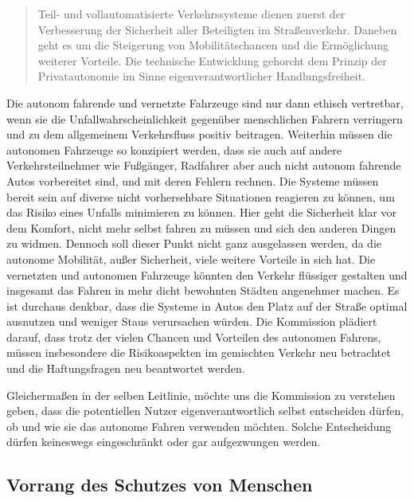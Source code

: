 \documentclass[twoside,a4paper,12pt]{article}
\begin{document}
\begin{quote}
\glqq
Teil- und vollautomatisierte Verkehrssysteme dienen zuerst der Verbesserung der Sicherheit aller Beteiligten im Straßenverkehr. 
Daneben geht es um die Steigerung von Mobilitätschancen und die Ermöglichung weiterer Vorteile. Die technische Entwicklung 
gehorcht dem Prinzip der Privatautonomie im Sinne eigenverantwortlicher Handlungsfreiheit.\grqq\mbox{~\cite[S. 10]{ek}}
\end{quote}
Die autonom fahrende und vernetzte Fahrzeuge sind nur dann ethisch vertretbar,
 wenn sie die Unfallwahrscheinlichkeit gegenüber menschlichen Fahrern verringern und zu dem allgemeinem Verkehrsfluss positiv beitragen.
 Weiterhin müssen die autonomen Fahrzeuge so konzipiert werden, dass sie auch auf andere Verkehrsteilnehmer wie Fußgänger,
 Radfahrer aber auch nicht autonom fahrende Autos  vorbereitet sind, und mit deren Fehlern rechnen. Die Systeme müssen bereit 
 sein auf diverse nicht vorhersehbare Situationen reagieren zu können, um das Risiko eines Unfalls minimieren zu können. Hier 
 geht die Sicherheit klar vor dem Komfort, nicht mehr selbst fahren zu müssen und sich den anderen Dingen zu widmen.
 Dennoch soll dieser Punkt nicht ganz ausgelassen werden, da die autonome Mobilität, außer Sicherheit, viele weitere Vorteile in sich hat.
 Die vernetzten und autonomen Fahrzeuge könnten den Verkehr flüssiger gestalten und insgesamt das Fahren in mehr dicht bewohnten Städten angenehmer machen. 
 Es ist durchaus denkbar, dass die Systeme in Autos den Platz auf der Straße optimal ausnutzen und weniger Staus verursachen würden.
 Die Kommission plädiert darauf, dass trotz der vielen Chancen und Vorteilen des autonomen Fahrens, müssen insbesondere die Risikoaspekten im gemischten Verkehr neu betrachtet
 und die Haftungsfragen neu beantwortet werden.

 Gleichermaßen in der selben Leitlinie, möchte uns die Kommission zu verstehen geben, dass die potentiellen Nutzer eigenverantwortlich selbst entscheiden dürfen,
 ob und wie sie das autonome Fahren verwenden möchten. Solche Entscheidung dürfen keineswegs eingeschränkt oder gar aufgezwungen werden.

\subsection{Vorrang des Schutzes von Menschen} \label{VorrangDesSchutzesVonMenschen}
\end{document}
